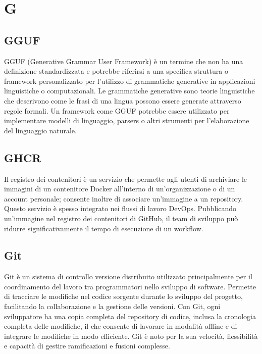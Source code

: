 \section{G}

\vspace{2em}
\subsection*{GGUF}
\par GGUF (Generative Grammar User Framework) è un termine che non ha una definizione standardizzata e potrebbe riferirsi a una specifica struttura o framework personalizzato per l'utilizzo di grammatiche generative in applicazioni linguistiche o computazionali. Le grammatiche generative sono teorie linguistiche che descrivono come le frasi di una lingua possono essere generate attraverso regole formali. Un framework come GGUF potrebbe essere utilizzato per implementare modelli di linguaggio, parsers o altri strumenti per l'elaborazione del linguaggio naturale.

\vspace{2em}
\subsection*{GHCR}
\par Il registro dei contenitori è un servizio che permette agli utenti di archiviare le immagini di un contenitore Docker all'interno di un'organizzazione o di un account personale; consente inoltre di associare un'immagine a un repository. Questo servizio è spesso integrato nei flussi di lavoro DevOps. Pubblicando un'immagine nel registro dei contenitori di GitHub, il team di sviluppo può ridurre significativamente il tempo di esecuzione di un workflow.

\vspace{2em}
\subsection*{Git}
\par Git è un sistema di controllo versione distribuito utilizzato principalmente per il coordinamento del lavoro tra programmatori nello sviluppo di software. Permette di tracciare le modifiche nel codice sorgente durante lo sviluppo del progetto, facilitando la collaborazione e la gestione delle versioni. Con Git, ogni sviluppatore ha una copia completa del repository di codice, inclusa la cronologia completa delle modifiche, il che consente di lavorare in modalità offline e di integrare le modifiche in modo efficiente. Git è noto per la sua velocità, flessibilità e capacità di gestire ramificazioni e fusioni complesse.

